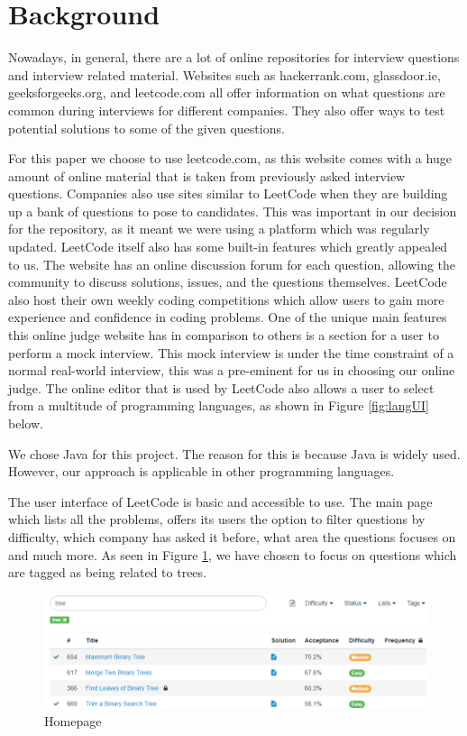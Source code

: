 \documentclass[10pt,twocolumn,hidelinks]{IEEEtran}
\begin{document}
\section{Background}
\par Nowadays, in general, there are a lot of online repositories for interview questions and interview related material. Websites such as hackerrank.com, glassdoor.ie, geeksforgeeks.org, and leetcode.com all offer information on what questions are common during interviews for different companies. They also offer ways to test potential solutions to some of the given questions. 
\par For this paper we choose to use leetcode.com\cite{leet1}, as this website comes with a huge amount of online material that is taken from previously asked interview questions. Companies also use sites similar to LeetCode when they are building up a bank of questions to pose to candidates. This was important in our decision for the repository, as it meant we were using a platform which was regularly updated. LeetCode itself also has some built-in features which greatly appealed to us. The website has an online discussion forum for each question, allowing the community to discuss solutions, issues, and the questions themselves. LeetCode also host their own weekly coding competitions which allow users to gain more experience and confidence in coding problems. One of the unique main features this online judge website has in comparison to others is a section for a user to perform a mock interview. This mock interview is under the time constraint of a normal real-world interview, this was a pre-eminent for us in choosing our online judge. The online editor that is used by LeetCode also allows a user to select from a multitude of programming languages, as shown in Figure \ref{fig:langUI} below.
\par We chose Java for this project. The reason for this is because Java is widely used. However, our approach is applicable in other programming languages.  
\par The user interface of LeetCode is basic and accessible to use. The main page which lists all the problems, offers its users the option to filter questions by difficulty, which company has asked it before, what area the questions focuses on and much more. As seen in Figure \ref{fig:homepage}, we have chosen to focus on questions which are tagged as being related to trees. 
\begin{figure}[h]
\includegraphics[scale=0.4]{homepageUI.png}
\caption{Homepage}
\label{fig:homepage}
\end{figure}
\end{document}
